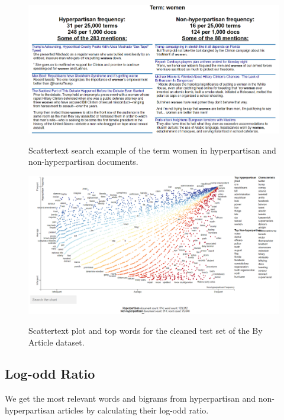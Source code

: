 \documentclass[11pt,a4paper]{article}
\begin{document}
\begin{figure}[ht]
    \centering
    \href{https://juletx.github.io/hyperpartisan-news-detection/by_article_test.html}{\includegraphics[width=\linewidth]{byarticle_test_search.png}}
    \caption{Scattertext search example of the term women in hyperpartisan and non-hyperpartisan documents.}
    \label{fig:byarticle_test_search}
\end{figure}

\begin{figure}[ht]
    \centering
    \href{https://juletx.github.io/hyperpartisan-news-detection/by_article_test_clean.html}{\includegraphics[width=\linewidth]{byarticle_test_clean.png}}
    \caption{Scattertext plot and top words for the cleaned test set of the By Article dataset.}
    \label{fig:byarticle_test_clean}
\end{figure}

\subsection{Log-odd Ratio}

We get the most relevant words and bigrams from hyperpartisan and non-hyperpartisan articles by calculating their log-odd ratio.
\end{document}
